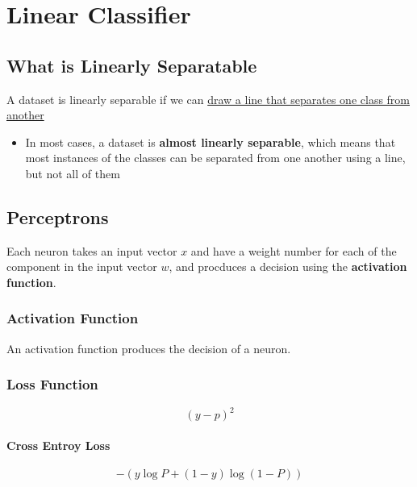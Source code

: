 \section{Linear Classifier}

  \subsection{What is Linearly Separatable}

    A dataset is linearly separable if we can \ul{draw a line that separates
    one class from another}

    \begin{itemize}
      \item In most cases, a dataset is \textbf{almost linearly separable},
      which means that most instances of the classes can be separated from
      one another using a line, but not all of them
    \end{itemize}

  \subsection{Perceptrons}

    Each neuron takes an input vector $ x $ and have a weight number for
    each of the component in the input vector $ w $, and procduces a
    decision using the \textbf{activation function}.

    \subsubsection{Activation Function}

      An activation function produces the decision of a neuron.

    \subsubsection{Loss Function}

      \begin{equation}
        \left( y - p \right)^{2}
      \end{equation}

      \paragraph{Cross Entroy Loss}
      \begin{equation}
        -\left( y \log P + \left( 1 - y \right) \log\left( 1 - P \right) \right)
      \end{equation}

